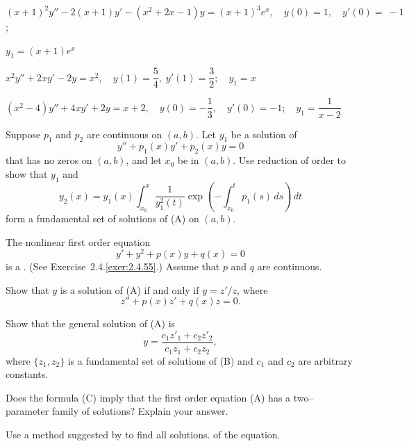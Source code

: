 \begin{exerciselist}
\item\label{exer:5.6.33}$(x+1)^2y''-2(x+1)y'-(x^2+2x-1)y=(x+1)^3e^x, \quad  y(0)=1,\quad y'(0)=~-1$;

$y_1=(x+1)e^x$





\item\label{exer:5.6.34}\CGex
$x^2y''+2xy'-2y=x^2, \quad   y(1)=\dfrac{5}{4},\;
y'(1)=\dfrac{3}{2};   \quad y_1=x$


\item\label{exer:5.6.35}\CGex
$(x^2-4)y''+4xy'+2y=x+2, \quad  y(0)=-\dfrac{1}{3},\quad y'(0)=-1;
\quad y_1=\dfrac{1}{x-2}$

\item\label{exer:5.6.36}Suppose $p_1$ and $p_2$ are continuous on $(a,b)$. Let $y_1$
be a solution of
\[
 y''+p_1(x)y'+p_2(x)y=0
\tag{A}
\]
that has no zeros on $(a,b)$, and let $x_0$ be in $(a,b)$.
Use reduction of order to show that $y_1$ and
\[
 y_2(x)=y_1(x)\int^x_{x_0}\frac{1}{y^2_1(t)} \exp
\left(-\int^t_{x_0}p_1(s)\, ds\right)\,dt
\]
form a fundamental set of solutions of (A) on
$(a,b)$. 

\color{black}
\item\label{exer:5.6.37}The nonlinear first order equation
\[
 y'+y^2+p(x)y+q(x)=0
\tag{A}
\]
is  a
.  (See
{Exercise~2.4.\ref{exer:2.4.55}}.) Assume that $p$ and $q$ are continuous.
\begin{alist}
\item %
Show that $y$ is a solution of (A) if and only if $y={z'/z}$, where
\[
 z''+p(x)z'+q(x)z=0.
\tag{B}
\]

\item %
 Show that the general solution of (A) is
\[ y=\frac{c_1z'_1+c_2z'_2}{c_1z_1+c_2z_2},
\tag{C}
\]
 where $\{z_1,z_2\}$ is a fundamental
set of solutions of (B) and $c_1$ and $c_2$ are
arbitrary constants.

\item %
Does the formula  (C) imply that the first order equation
(A) has a two--parameter family of solutions?
Explain your answer.
 \end{alist}

\item\label{exer:5.6.38}Use a method suggested by   to find all
solutions. of the  equation.


\end{exerciselist}
